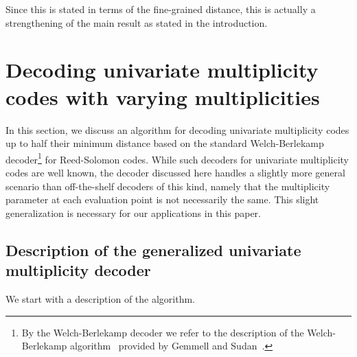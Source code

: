 \documentclass{article}
\begin{document}
	Since this is stated in terms of the fine-grained distance, this is actually a strengthening of the main result as stated in the introduction.
	
	\section{Decoding univariate multiplicity codes with varying
		multiplicities}\label{sec:BWmultiplicity}
	In this section, we discuss an algorithm for decoding univariate
	multiplicity codes up to half their minimum distance based on the
	standard Welch-Berlekamp decoder\footnote{By the
		Welch-Berlekamp decoder we refer to the description of the Welch-Berlekamp algorithm~\cite{WelchB1986} provided by
		Gemmell and Sudan~\cite{GemmellS1992}.} for Reed-Solomon codes. While such
	decoders for univariate multiplicity codes are well known, the decoder
	discussed here handles a slightly more general scenario than
	off-the-shelf decoders of this kind, namely that the multiplicity
	parameter at each evaluation point is not necessarily the same. This
	slight generalization is necessary for our applications in this
	paper. %
	
	\subsection{Description of the generalized univariate multiplicity decoder}
	
	We start with a description of the algorithm.
\end{document}
